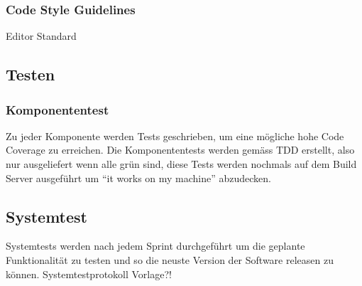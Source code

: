 \documentclass[11pt]{scrartcl}
\begin{document}
\subsubsection{Code Style Guidelines}
Editor Standard

\subsection{Testen}
\subsubsection{Komponententest}
Zu jeder Komponente werden Tests geschrieben, um eine mögliche hohe Code 
Coverage zu erreichen.
Die Komponententests werden gemäss TDD erstellt, also nur ausgeliefert wenn alle 
grün sind, diese Tests werden nochmals auf dem Build Server ausgeführt um ``it 
works on my machine'' abzudecken.
\subsection{Systemtest}
Systemtests werden nach jedem Sprint durchgeführt um die geplante Funktionalität 
zu testen und so die neuste Version der Software releasen zu können.
Systemtestprotokoll Vorlage?!
\end{document}
